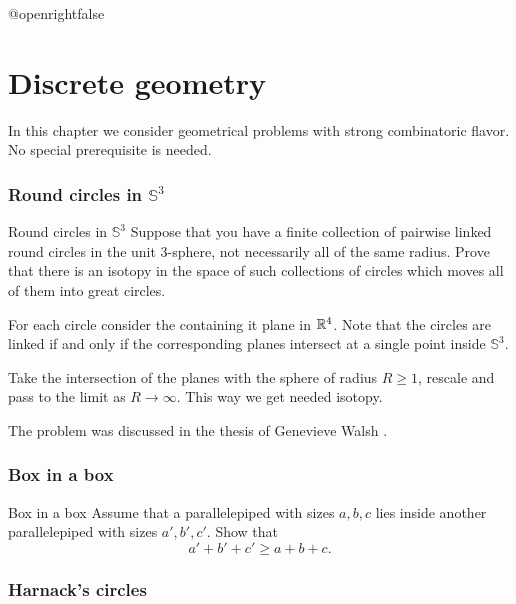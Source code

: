 \csname @openrightfalse\endcsname
\chapter{Discrete geometry}

In this chapter we consider geometrical problems with strong combinatoric flavor.
No special prerequisite is needed.

\subsection*{Round circles in $\mathbb{S}^3$}

\begin{pr}{\easy}{Round circles in $\mathbb{S}^3$}\label{Round circles}
Suppose that you have a finite collection of pairwise linked round circles in the unit 3-sphere, 
not necessarily all of the same radius. 
Prove that there is an isotopy in the space of such collections of circles 
which moves all of them into great circles.
\end{pr}


For each circle consider the containing it plane in $\mathbb{R}^4$.
Note that the circles are linked 
if and only if 
the corresponding planes intersect at a single point inside $\mathbb{S}^3$.

Take the intersection of the planes with the sphere of radius $R\ge 1$,
rescale and pass to the limit as $R\to\infty$.  
This way we get needed isotopy.\qeds

The problem was discussed 
in the thesis of Genevieve Walsh \cite[see][]{walsh}.

\subsection*{Box in a box}

\begin{pr}{}{Box in a box}\label{box-in-box} 
Assume that a parallelepiped with sizes $a,b,c$ 
lies inside another parallelepiped with sizes $a',b',c'$. 
Show that 
\[a'+b'+c'\ge a+b+c.\]

\end{pr}

\subsection*{Harnack's circles}

